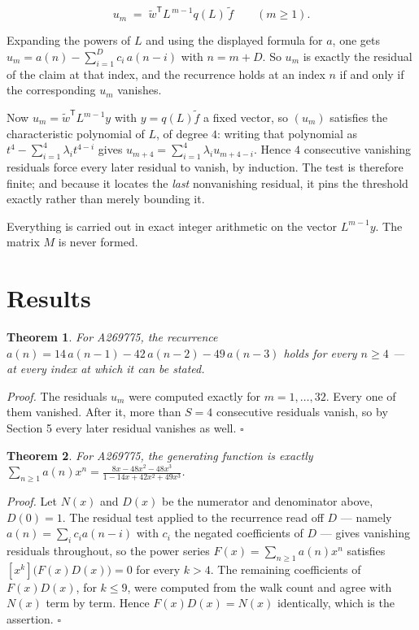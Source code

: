 \documentclass[11pt]{article}
\newtheorem{theorem}{Theorem}
\theoremstyle{definition}
\begin{document}
\[u_m \;=\; \tilde w^{\mathsf T} L^{\,m-1} q(L)\,\tilde f \qquad (m \ge 1).\]

Expanding the powers of $L$ and using the displayed formula for $a$, one gets $u_m = a(n) - \sum_{i=1}^{D} c_i\,a(n-i)$ with $n = m + D$. So $u_m$ is exactly the residual of the claim at that index, and the recurrence holds at an index $n$ if and only if the corresponding $u_m$ vanishes.

Now $u_m = \tilde w^{\mathsf T} L^{m-1} y$ with $y = q(L)\tilde f$ a fixed vector, so $(u_m)$ satisfies the characteristic polynomial of $L$, of degree $4$: writing that polynomial as $t^{4} - \sum_{i=1}^{4} \lambda_i t^{4-i}$ gives $u_{m+4} = \sum_{i=1}^{4} \lambda_i u_{m+4-i}$. Hence $4$ consecutive vanishing residuals force every later residual to vanish, by induction. The test is therefore finite; and because it locates the {\itshape last} nonvanishing residual, it pins the threshold exactly rather than merely bounding it.

Everything is carried out in exact integer arithmetic on the vector $L^{m-1}y$. The matrix $M$ is never formed.

\section{Results}

\begin{theorem} For A269775, the recurrence $a(n) = 14\,a(n-1) - 42\,a(n-2) - 49\,a(n-3)$ holds for every $n \ge 4$ --- at every index at which it can be stated.\end{theorem}

{\itshape Proof.} The residuals $u_m$ were computed exactly for $m = 1,\dots,32$. Every one of them vanished. After it, more than $S = 4$ consecutive residuals vanish, so by Section 5 every later residual vanishes as well. $\square$

\begin{theorem} For A269775, the generating function is exactly $\sum_{n\ge 1} a(n)x^n = \frac{8x - 48x^{2} - 48x^{3}}{1 - 14x + 42x^{2} + 49x^{3}}$.\end{theorem}

{\itshape Proof.} Let $N(x)$ and $D(x)$ be the numerator and denominator above, $D(0)=1$. The residual test applied to the recurrence read off $D$ --- namely $a(n) = \sum_i c_i a(n-i)$ with $c_i$ the negated coefficients of $D$ --- gives vanishing residuals throughout, so the power series $F(x)=\sum_{n\ge 1}a(n)x^n$ satisfies $[x^k]\bigl(F(x)D(x)\bigr) = 0$ for every $k > 4$. The remaining coefficients of $F(x)D(x)$, for $k \le 9$, were computed from the walk count and agree with $N(x)$ term by term. Hence $F(x)D(x) = N(x)$ identically, which is the assertion. $\square$
\end{document}
